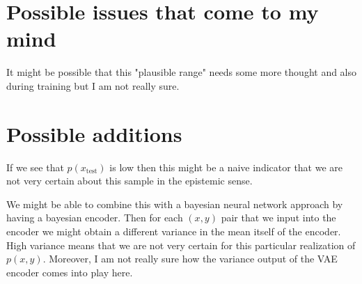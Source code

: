 \documentclass[11pt]{article}
\begin{document}
\section{Possible issues that come to my mind}
It might be possible that this "plausible range" needs some more thought and also during training but I am not really sure. 

\section{Possible additions}
If we see that $p(x_{\text{test}})$ is low then this might be a naive indicator that we are not very certain about this sample in the epistemic sense.


We might be able to combine this with a bayesian neural network approach by having a bayesian encoder. Then for each $(x,y)$ pair that we input into the encoder we might obtain a different variance in the mean itself of the encoder. High variance means that we are not very certain for this particular realization of $p(x,y)$. Moreover, I am not really sure how the variance output of the VAE encoder comes into play here.



\end{document}
